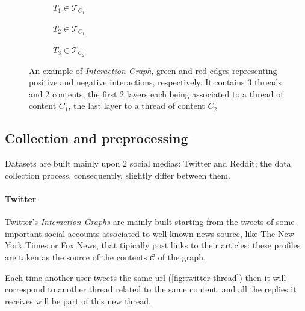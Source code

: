 \begin{figure}
	\begin{center}
		\begin{subfigure}[b]{0.3\textwidth}
			\centering
			\caption{$T_{1} \in \mathcal{T}_{C_{1}} $}
			\label{fig:tex/tikz/graph_thread1.tikz}
		\end{subfigure}
		\begin{subfigure}[b]{0.3\textwidth}
			\centering
			\caption{$T_{2} \in \mathcal{T}_{C_{1}} $}
			\label{fig:tex/tikz/graph_thread2.tikz}
		\end{subfigure}
		\begin{subfigure}[b]{0.3\textwidth}
			\centering
			\caption{$T_{3} \in \mathcal{T}_{C_{2}} $}
			\label{fig:tex/tikz/graph_thread3.tikz}
		\end{subfigure}
	\end{center}
	\caption{An example of \emph{Interaction Graph}, green and red edges
		representing positive and negative interactions, respectively. It
		contains $3$ threads and $2$ contents, the first $2$ layers each being
		associated to a thread of content $C_{1} $, the last layer to a thread
		of content $C_{2} $}
	\label{fig:interaction-graph-example}
\end{figure}

\subsection{Collection and preprocessing}%
\label{sub:collection_and_preprocessing}

Datasets are built mainly upon $2$ social medias: Twitter and Reddit; the data
collection process, consequently, slightly differ between them.

\paragraph{Twitter}%
\label{par:twitter-data}

Twitter's \emph{Interaction Graphs} are mainly built starting from the tweets
of some important social accounts associated to well-known news source, like The
New York Times or Fox News, that tipically post links to their articles:
these profiles are taken as the source of the contents $\mathcal{C} $ of the graph.

Each time another user tweets the same url (\autoref{fig:twitter-thread}) then
it will correspond to another thread related to the same content, and all the
replies it receives will be part of this new thread.

